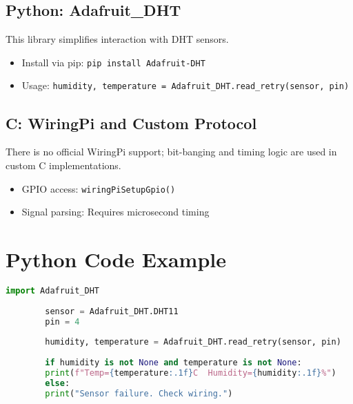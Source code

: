 \documentclass{article}
\begin{document}
	\subsection*{Python: Adafruit\_DHT}
	This library simplifies interaction with DHT sensors.
	\begin{itemize}
		\item Install via pip: \texttt{pip install Adafruit-DHT}
		\item Usage: \texttt{humidity, temperature = Adafruit\_DHT.read\_retry(sensor, pin)}
	\end{itemize}
	
	\subsection*{C: WiringPi and Custom Protocol}
	There is no official WiringPi support; bit-banging and timing logic are used in custom C implementations.
	\begin{itemize}
		\item GPIO access: \texttt{wiringPiSetupGpio()}
		\item Signal parsing: Requires microsecond timing
	\end{itemize}
	
	\section{Python Code Example}
	\begin{lstlisting}[language=Python]
		import Adafruit_DHT
		
		sensor = Adafruit_DHT.DHT11
		pin = 4
		
		humidity, temperature = Adafruit_DHT.read_retry(sensor, pin)
		
		if humidity is not None and temperature is not None:
		print(f"Temp={temperature:.1f}C  Humidity={humidity:.1f}%")
		else:
		print("Sensor failure. Check wiring.")
	\end{lstlisting}
	
\end{document}
